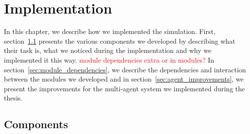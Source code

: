 \chapter{Implementation}
\label{cha:implementation}
In this chapter, we describe how we implemented the simulation. First, section~\ref{sec:components} presents the various components we developed by describing what their task is, what we noticed during the implementation and why we implemented it this way. \textcolor{red}{module dependencies extra or in modules?} In section~\ref{sec:module_dependencies}, we describe the dependencies and interaction between the modules we developed and in section~\ref{sec:agent_improvements}, we present the improvements for the multi-agent system we implemented during the thesis.

\section{Components}
\label{sec:components}
